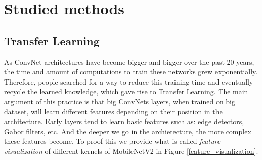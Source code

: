 \documentclass[12pt, a4paper]{report}
\begin{document}
		\section{Studied methods}
			\subsection{Transfer Learning}
				As ConvNet architectures have become bigger and bigger over the past 20 years, the time and amount of computations to train these networks grew exponentially.
				Therefore, people searched for a way to reduce this training time and eventually recycle the learned knowledge, which gave rise to Transfer Learning.
				The main argument of this practice is that big ConvNets layers, when trained on big dataset, will learn different features depending on their position in the architecture.
				Early layers tend to learn basic features such as: edge detectors, Gabor filters, etc.
				And the deeper we go in the archietecture, the more complex these features become.
				To proof this we provide what is called {\itshape feature visualization} of different kernels of MobileNetV2 in Figure \ref{feature_visualization}.
\end{document}
